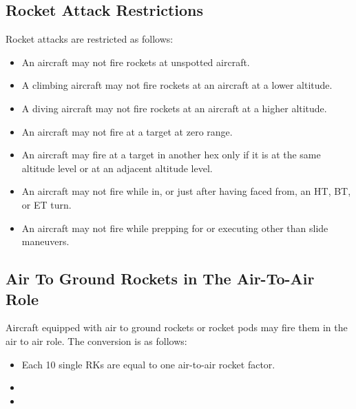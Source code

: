 \begin{advancedrules}
    \subsection{Rocket Attack Restrictions} Rocket attacks are restricted as follows:

    \begin{itemize}

        \item An aircraft may not fire rockets at unspotted aircraft.

        \item A climbing aircraft may not fire rockets at an aircraft at a lower altitude.

        \item A diving aircraft may not fire rockets at an aircraft at a higher altitude.

        \item An aircraft may not fire at a target at zero range.

        \item An aircraft  may fire at a target in another hex only if it is at the same altitude level or at an adjacent altitude level.

        \item An aircraft may not fire while in, or just after having faced from, an HT, BT, or ET turn.

        \item An aircraft may not fire while prepping for or executing other than slide maneuvers.

    \end{itemize}


    \subsection{Air To Ground Rockets in The Air-To-Air Role} Aircraft equipped with air to ground rockets or rocket pods may fire them in the air to air role.  The conversion is as follows:

    \begin{itemize}
        \item Each 10 single RKs are equal to one air-to-air rocket factor.
        \item {}
        \item {}
    \end{itemize}


\end{advancedrules}
